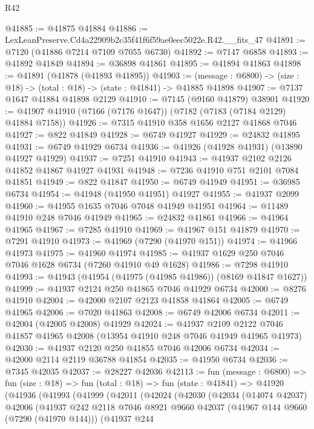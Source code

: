 \begin{lexlean}{R42}
\begin{coremodule}
{@41885 := @41875 @41884
@41886 := LexLeanPreserve.Cd4a22909b2c35f41f6f59ae0eec5022e.R42.__fits_47
@41891 := @7120 (@41886 @7214 @7109 @7055 @6730)
@41892 := @7147 @6858
@41893 := @41892 @41849
@41894 := @36898 @41861
@41895 := @41894 @41863
@41898 := @41891 (@41878 (@41893 @41895))
@41903 := (message : @6800) -> (size : @18) -> (total : @18) -> (state : @41841) -> @41885 @41898
@41907 := @7137 @1647 @41884 @41898 @2129
@41910 := @7145 (@9160 @41879) @38901
@41920 := @41907 @41910 (@7166 (@7176 @1647)) (@7182 (@7183 (@7184 @2129) @41884 @7158))
@41926 := @7315 @41910 @358 @1656 @2127 @41868 @7046
@41927 := @822 @41849
@41928 := @6749 @41927
@41929 := @24832 @41895
@41931 := @6749 @41929 @6734
@41936 := @41926 (@41928 @41931) (@13890 @41927 @41929)
@41937 := @7251 @41910
@41943 := @41937 @2102 @2126 @41852 @41867 @41927 @41931
@41948 := @7236 @41910 @751 @2101 @7084 @41851
@41949 := @822 @41847
@41950 := @6749 @41949
@41951 := @36985 @6734
@41954 := @41948 (@41950 @41951) @41927
@41955 := @41937 @2099
@41960 := @41955 @1635 @7046 @7048 @41949 @41951
@41964 := @11489 @41910 @248 @7046 @41949
@41965 := @24832 @41861
@41966 := @41964 @41965
@41967 := @7285 @41910
@41969 := @41967 @151 @41879
@41970 := @7291 @41910
@41973 := @41969 (@7290 (@41970 @151))
@41974 := @41966 @41973
@41975 := @41960 @41974
@41985 := @41937 @1629 @250 @7046 @7046 @1628 @6734 (@7260 @41910 @49 @1628)
@41986 := @7298 @41910
@41993 := @41943 (@41954 (@41975 (@41985 @41986)) (@8169 @41847 @1627))
@41999 := @41937 @2124 @250 @41865 @7046 @41929 @6734
@42000 := @8276 @41910
@42004 := @42000 @2107 @2123 @41858 @41864
@42005 := @6749 @41965
@42006 := @7020 @41863
@42008 := @6749 @42006 @6734
@42011 := @42004 (@42005 @42008) @41929
@42024 := @41937
    @2109
    @2122
    @7046
    @41857
    @41965
    @42008
    (@13954 @41910 @248 @7046 @41949 @41965 @41973)
@42030 := @41937 @2120 @250 @41855 @7046 @42006 @6734
@42034 := @42000 @2114 @2119 @36788 @41854
@42035 := @41950 @6734
@42036 := @7345 @42035
@42037 := @28227 @42036
@42113 := fun (message : @6800) =>
  fun (size : @18) =>
  fun (total : @18) =>
  fun (state : @41841) =>
  @41920
    (@41936
      (@41993
        (@41999
          (@42011
            (@42024
              (@42030
                (@42034
                  (@14074 @42037)
                  @42006
                  (@41937
                    @242
                    @2118
                    @7046
                    @8921
                    @9660
                    @42037
                    (@41967 @144 @9660 (@7290 (@41970 @144)))
                    (@41937
                      @244
}
\end{coremodule}
\end{lexlean}
